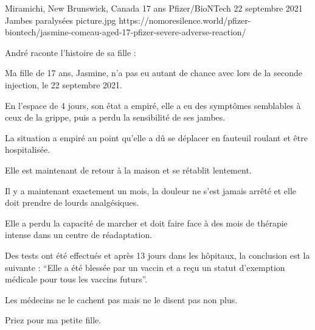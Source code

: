 {Miramichi, New Brunswick, Canada}
{17 ans}
{Pfizer/BioNTech}
{22 septembre 2021}
{Jambes paralysées}
{picture.jpg}
{https://nomoresilence.world/pfizer-biontech/jasmine-comeau-aged-17-pfizer-severe-adverse-reaction/}
{

André raconte l'histoire de sa fille :

Ma fille de 17 ans, Jasmine, n'a pas eu autant de chance avec lors de la seconde
injection, le 22 septembre 2021.

En l'espace de 4 jours, son état a empiré, elle a eu des symptômes semblables à
ceux de la grippe, puis a perdu la sensibilité de ses jambes.

La situation a empiré au point qu'elle a dû se déplacer en fauteuil roulant et
être hospitalisée.

Elle est maintenant de retour à la maison et se rétablit lentement.

Il y a maintenant exactement un mois, la douleur ne s'est jamais arrêté et elle
doit prendre de lourds analgésiques.

Elle a perdu la capacité de marcher et doit faire face à des mois de thérapie
intense dans un centre de réadaptation.

Des tests ont été effectués et après 13 jours dans les hôpitaux, la conclusion
est la suivante : “Elle a été blessée par un vaccin et a reçu un statut
d'exemption médicale pour tous les vaccins futurs”.

Les médecins ne le cachent pas mais ne le disent pas non plus.

Priez pour ma petite fille.

}
